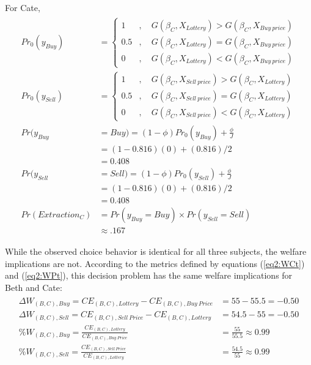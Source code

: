\documentclass[11pt,a4paper]{report}
\newcommand\CE{\ensuremath{\mathit{CE}}}    %
\newcommand\Prob{\ensuremath{\mathit{Pr}}}  %
\begin{document}
\noindent For Cate,
\begin{align}
	\label{eq2:Cate}
	\begin{split}
		{\Prob}_0(y_{\mathit{Buy}}) &=
		\begin{cases}
			1 &, \quad G(\beta_C,X_{\mathit{Lottery}}) > G(\beta_C,X_{\mathit{Buy\ price}})\\
			0.5 &, \quad G(\beta_C,X_{\mathit{Lottery}}) = G(\beta_C,X_{\mathit{Buy\ price}})\\
			0 &, \quad G(\beta_C,X_{\mathit{Lottery}}) < G(\beta_C,X_{\mathit{Buy\ price}})
		\end{cases} \\
		{\Prob}_0(y_{\mathit{Sell}}) &=
		\begin{cases}
			1 &, \quad G(\beta_C,X_{\mathit{Sell\ price}}) > G(\beta_C,X_{\mathit{Lottery}})\\
			0.5 &, \quad G(\beta_C,X_{\mathit{Sell\ price}}) = G(\beta_C,X_{\mathit{Lottery}})\\
			0 &, \quad G(\beta_C,X_{\mathit{Sell\ price}}) < G(\beta_C,X_{\mathit{Lottery}})
		\end{cases}\\
		{\Prob}(y_{\mathit{Buy}}&=\mathit{Buy}) = (1-\phi) {\Prob}_0(y_{\mathit{Buy}}) + \frac{\phi}{J}\\
		&=(1-0.816)(0) + (0.816)/2\\
		&=0.408\\
		{\Prob}(y_{\mathit{Sell}}&=\mathit{Sell}) = (1-\phi) {\Prob}_0(y_{\mathit{Sell}}) + \frac{\phi}{J}\\
		&=(1-0.816)(0) + (0.816)/2\\
		&=0.408\\
	{\Prob}(\mathit{Extraction}_C) &= {\Prob}(y_{\mathit{Buy}} = \mathit{Buy}) \times {\Prob}(y_{\mathit{Sell}} = \mathit{Sell})\\
	&\approx .167
	\end{split}
\end{align}

While the observed choice behavior is identical for all three subjects, the welfare implications are not.
According to the metrics defined by equations (\ref{eq2:WCt}) and (\ref{eq2:WPt}), this decision problem has the same welfare implications for Beth and Cate:
\begin{align}
	\label{eq2:BCwelfare}
	\begin{split}
		\Delta W_{(B,C),\mathit{Buy}} = {\CE}_{(B,C),\mathit{Lottery}} - {\CE}_{(B,C),\mathit{Buy\ Price}} &= 55 - 55.5 = -0.50\\
		\Delta W_{(B,C),\mathit{Sell}} = {\CE}_{(B,C),\mathit{Sell\ Price}} - {\CE}_{(B,C),\mathit{Lottery}} &= 54.5 - 55 = -0.50\\
		\% W_{(B,C),\mathit{Buy}} = \frac{{\CE}_{(B,C),\mathit{Lottery}}}{{\CE}_{(B,C),\mathit{Buy\ Price}}} &= \frac{55}{55.5} \approx 0.99\\
		\% W_{(B,C),\mathit{Sell}} = \frac{{\CE}_{(B,C),\mathit{Sell\ Price}}}{{\CE}_{(B,C),\mathit{Lottery}}} &= \frac{54.5}{55} \approx 0.99
	\end{split}
\end{align}
\end{document}
